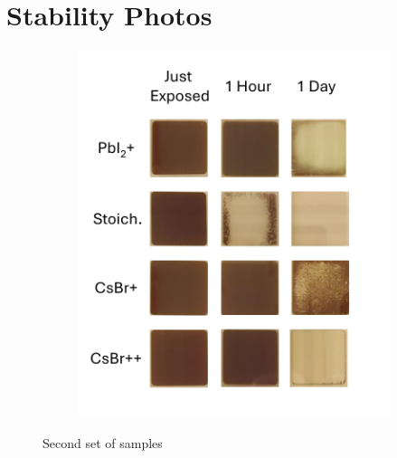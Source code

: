 \chapter{Stability Photos}\label{ch:appendixB}

\begin{figure}[htbp]
    \centering
    \begin{subfigure}[t]{0.5\textwidth}
        \centering
        \includegraphics[width=\textwidth]{chapters/appendixB/images/Stability_Rotation_Stoichiometries_v2.pdf} %
             
    \end{subfigure}

    \caption{Second set of samples}
    \label{fig:appendix:stoichiometry_rotation_V2}
\end{figure}


